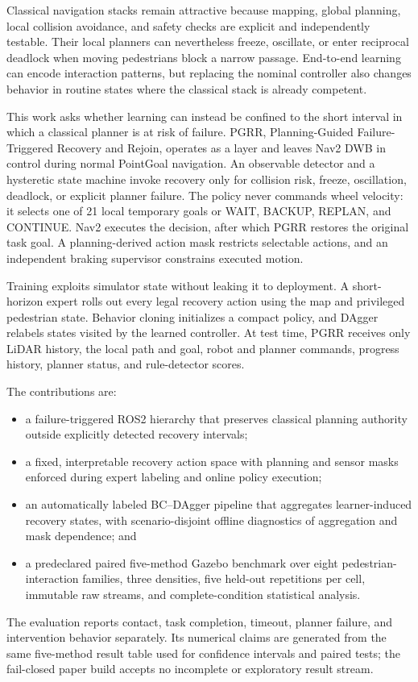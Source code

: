 Classical navigation stacks remain attractive because mapping, global planning,
local collision avoidance, and safety checks are explicit and independently
testable.  Their local planners can nevertheless freeze, oscillate, or enter
reciprocal deadlock when moving pedestrians block a narrow passage.  End-to-end
learning can encode interaction patterns, but replacing the nominal controller
also changes behavior in routine states where the classical stack is already
competent.

This work asks whether learning can instead be confined to the short interval in
which a classical planner is at risk of failure.  PGRR, Planning-Guided
Failure-Triggered Recovery and Rejoin, operates as a layer and leaves Nav2 DWB in
control during normal PointGoal navigation.  An observable detector and a
hysteretic state machine invoke recovery only for collision risk, freeze,
oscillation, deadlock, or explicit planner failure.  The policy never commands
wheel velocity: it selects one of 21 local temporary goals or WAIT, BACKUP,
REPLAN, and CONTINUE.  Nav2 executes the decision, after which PGRR restores the
original task goal.  A planning-derived action mask restricts selectable
actions, and an independent braking supervisor constrains executed motion.

Training exploits simulator state without leaking it to deployment.  A
short-horizon expert rolls out every legal recovery action using the map and
privileged pedestrian state.  Behavior cloning initializes a compact policy,
and DAgger relabels states visited by the learned controller.  At test time, PGRR
receives only LiDAR history, the local path and goal, robot and planner commands,
progress history, planner status, and rule-detector scores.

The contributions are:
\begin{itemize}
  \item a failure-triggered ROS2 hierarchy that preserves classical planning
  authority outside explicitly detected recovery intervals;
  \item a fixed, interpretable recovery action space with planning and sensor
  masks enforced during expert labeling and online policy execution;
  \item an automatically labeled BC--DAgger pipeline that aggregates
  learner-induced recovery states, with scenario-disjoint offline diagnostics
  of aggregation and mask dependence; and
  \item a predeclared paired five-method Gazebo benchmark over eight
  pedestrian-interaction families, three densities, five held-out repetitions
  per cell, immutable raw streams, and complete-condition statistical analysis.
\end{itemize}
The evaluation reports contact, task completion, timeout, planner failure, and
intervention behavior separately.  Its numerical claims are generated from the
same five-method result table used for confidence intervals and paired tests;
the fail-closed paper build accepts no incomplete or exploratory result stream.
